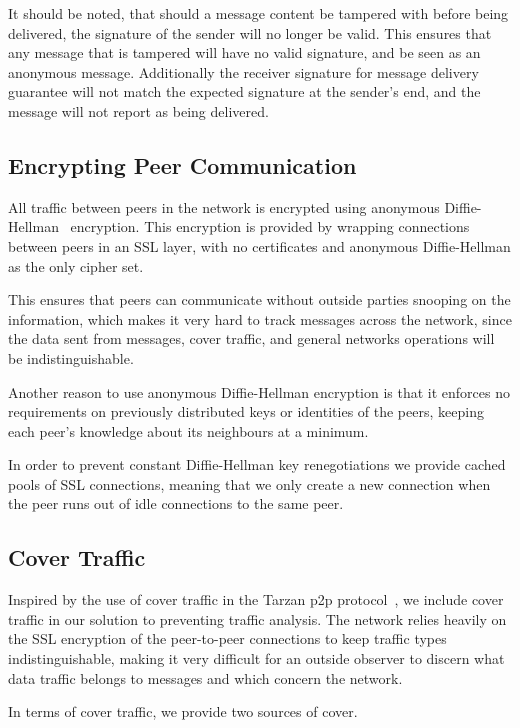 It should be noted, that should a message content be tampered with before being delivered, the signature of the sender will no longer be valid. This ensures that any message that is tampered will have no valid signature, and be seen as an anonymous message.
Additionally the receiver signature for message delivery guarantee will not match the expected signature at the sender's end, and the message will not report as being delivered.
 
\subsection{Encrypting Peer Communication}

All traffic between peers in the network is encrypted using anonymous Diffie-Hellman~\citep{DH} encryption. This encryption is provided by wrapping connections between peers in an SSL layer, with no certificates and anonymous Diffie-Hellman as the only cipher set.

This ensures that peers can communicate without outside parties snooping on the information, which makes it very hard to track messages across the network, since the data sent from messages, cover traffic, and general networks operations will be indistinguishable.

Another reason to use anonymous Diffie-Hellman encryption is that it enforces no requirements on previously distributed keys or identities of the peers, keeping each peer's knowledge about its neighbours at a minimum.

In order to prevent constant Diffie-Hellman key renegotiations we provide cached pools of SSL connections, meaning that we only create a new connection when the peer runs out of idle connections to the same peer.

\subsection{Cover Traffic}

Inspired by the use of cover traffic in the Tarzan p2p protocol~\citep{tarzan}, we include cover traffic in our solution to preventing traffic analysis. The network relies heavily on the SSL encryption of the peer-to-peer connections to keep traffic types indistinguishable, making it very difficult for an outside observer to discern what data traffic belongs to messages and which concern the network.

In terms of cover traffic, we provide two sources of cover.

